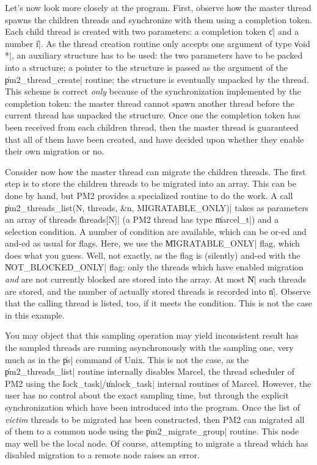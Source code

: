 Let's now look more closely at the program. First, observe how the
master thread spawns the children threads and synchronize with them
using a completion token. Each child thread is created with two
parameters: a completion token \|c| and a number \|i|. As the thread
creation routine only accepts one argument of type \|void *|, an
auxiliary structure has to be used: the two parameters have to be
packed into a structure; a pointer to the structure is passed as the
argument of the \|pm2_thread_create| routine; the structure is
eventually unpacked by the thread. This scheme is correct \emph{only}
because of the synchronization implemented by the completion token:
the master thread cannot spawn another thread before the current
thread has unpacked the structure.  Once one the completion token has
been received from each children thread, then the master thread is
guaranteed that all of them have been created, and have decided upon
whether they enable their own migration or no.

Consider now how the master thread can migrate the children threads.
The first step is to store the children threads to be migrated into an
array.  This can be done by hand, but PM2 provides a specialized
routine to do the work. A call \|pm2_threads_list(N, threads, &n,
MIGRATABLE_ONLY)| takes as parameters an array of threads
\|threads[N]| (a PM2 thread has type \|marcel_t|) and a selection
condition. A number of condition are available, which can be or-ed and
and-ed as usual for flags. Here, we use the \|MIGRATABLE_ONLY| flag,
which does what you guess. Well, not exactly, as the flag is
(silently) and-ed with the \|NOT_BLOCKED_ONLY| flag: only the threads
which have enabled migration \emph{and} are not currently blocked are
stored into the array. At most \|N| such threads are stored, and the
number of actually stored threads is recorded into \|n|. Observe that
the calling thread is listed, too, if it meets the condition. This is
not the case in this example.

You may object that this sampling operation may yield inconsistent
result has the sampled threads are running asynchronously with the
sampling one, very much as in the \|ps| command of Unix. This is not
the case, as the \|pm2_threads_list| routine internally disables
Marcel, the thread scheduler of PM2 using the
\|lock_task|/\|unlock_task| internal routines of Marcel. However, the
user has no control about the exact sampling time, but through the
explicit synchronization which have been introduced into the program.
Once the list of \emph{victim} threads to be migrated has been
constructed, then PM2 can migrated all of them to a common node using
the \|pm2_migrate_group| routine. This node may well be the local
node.  Of course, attempting to migrate a thread which has disabled
migration to a remote node raises an error.

